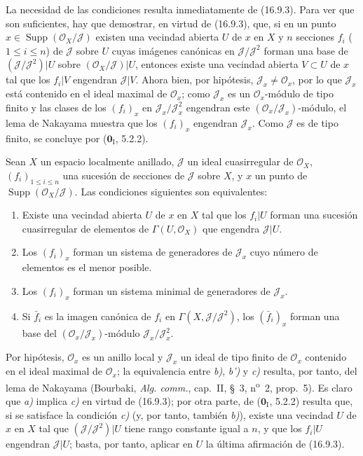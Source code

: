 La necesidad de las condiciones resulta inmediatamente de (16.9.3). Para ver
que son suficientes, hay que demostrar, en virtud de (16.9.3), que, si en un
punto $x\in\operatorname{Supp}(\mathcal{O}_X/\mathscr J)$ existen una
vecindad abierta $U$ de $x$ en $X$ y $n$ secciones $f_i$
($1\leq i\leq n$) de $\mathscr J$ sobre $U$ cuyas imágenes canónicas en
$\mathscr J/\mathscr J^2$ forman una base de
$(\mathscr J/\mathscr J^2)|U$ sobre
$(\mathcal{O}_X/\mathscr J)|U$, entonces existe una vecindad abierta
$V\subset U$ de $x$ tal que los $f_i|V$ engendran $\mathscr J|V$. Ahora
bien, por hipótesis, $\mathscr J_x\neq\mathcal{O}_x$, por lo que
$\mathscr J_x$ está contenido en el ideal maximal de $\mathcal{O}_x$; como
$\mathscr J_x$ es un $\mathcal{O}_x$-módulo de tipo finito y las clases de
los $(f_i)_x$ en $\mathscr J_x/\mathscr J_x^2$ engendran este
$(\mathcal{O}_x/\mathscr J_x)$-módulo, el lema de Nakayama muestra que los
$(f_i)_x$ engendran $\mathscr J_x$. Como $\mathscr J$ es de tipo finito,
se concluye por ($\mathbf{0}_{\mathrm I}$, 5.2.2).

\begin{corollary}[16.9.5]
\label{IV.16.9.5}
Sean $X$ un espacio localmente anillado, $\mathscr J$ un ideal cuasirregular
de $\mathcal{O}_X$, $(f_i)_{1\leq i\leq n}$ una sucesión de secciones de
$\mathscr J$ sobre $X$, y
$x$ un punto de $\operatorname{Supp}(\mathcal{O}_X/\mathscr J)$. Las
condiciones siguientes son equivalentes:
\begin{enumerate}
  \item[\textup{a)}] Existe una vecindad abierta $U$ de $x$ en $X$ tal que los
  $f_i|U$ forman una sucesión cuasirregular de elementos de
  $\Gamma(U,\mathcal{O}_X)$ que engendra $\mathscr J|U$.
  \item[\textup{b)}] Los $(f_i)_x$ forman un sistema de generadores de
  $\mathscr J_x$ cuyo número de elementos es el menor posible.
  \item[\textup{b$'$)}] Los $(f_i)_x$ forman un sistema minimal de generadores de
  $\mathscr J_x$.
  \item[\textup{c)}] Si $\bar f_i$ es la imagen canónica de $f_i$ en
  $\Gamma(X,\mathscr J/\mathscr J^2)$, los $(\bar f_i)_x$ forman una base
  del $(\mathcal{O}_x/\mathscr J_x)$-módulo
  $\mathscr J_x/\mathscr J_x^2$.
\end{enumerate}
\end{corollary}

Por hipótesis, $\mathcal{O}_x$ es un anillo local y $\mathscr J_x$ un ideal
de tipo finito de $\mathcal{O}_x$ contenido en el ideal maximal de
$\mathcal{O}_x$; la equivalencia entre \emph{b)}, \emph{b')} y \emph{c)} resulta, por tanto, del
lema de Nakayama (Bourbaki, \emph{Alg. comm.}, cap.~II, §~3,
n\textsuperscript{o}~2, prop.~5). Es claro que \emph{a)} implica \emph{c)} en virtud de
(16.9.3); por otra parte, de ($\mathbf{0}_{\mathrm I}$, 5.2.2) resulta que, si se
satisface la condición \emph{c)} (y, por tanto, también \emph{b)}), existe una vecindad $U$
de $x$ en $X$ tal que $(\mathscr J/\mathscr J^2)|U$ tiene rango constante
igual a $n$, y que los $f_i|U$ engendran $\mathscr J|U$; basta, por tanto,
aplicar en $U$ la última afirmación de (16.9.3).

